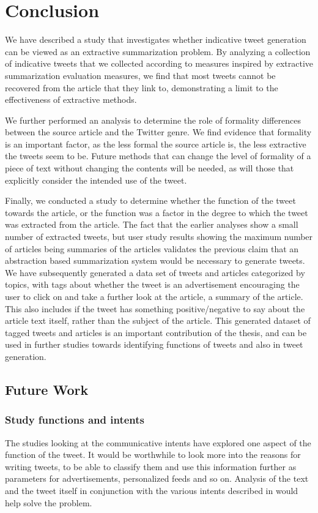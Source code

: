 \chapter{Conclusion}
We have described a study that investigates whether indicative tweet generation can be viewed as an extractive summarization problem. By analyzing a collection of indicative tweets that we collected according to measures inspired by extractive summarization evaluation measures, we find that most tweets cannot be recovered from the article that they link to, demonstrating a limit to the effectiveness of extractive methods.

We further performed an analysis to determine the role of formality differences between the source article and the Twitter genre. We find evidence that formality is an important factor, as the less formal the source article is, the less extractive the tweets seem to be. Future methods that can change the level of formality of a piece of text without changing the contents will be needed, as will those that explicitly consider the intended use of the tweet.

Finally, we conducted a study to determine whether the function of the tweet towards the article, or the function was a factor in the degree to which the tweet was extracted from the article. The fact that the earlier analyses show a small number of extracted tweets, but user study results showing the maximum number of articles being summaries of the articles validates the previous claim that an abstraction based summarization system would be necessary to generate tweets. We have subsequently generated a data set of tweets and articles categorized by topics, with tags about whether the tweet is an advertisement encouraging the user to click on and take a further look at the article, a summary of the article. This also includes if the tweet has something positive/negative to say about the article text itself, rather than the subject of the article. This generated dataset of tagged tweets and articles is an important contribution of the thesis, and can be used in further studies towards identifying functions of tweets and also in tweet generation.

\section{Future Work}

\subsection{Study functions and intents}
The studies looking at the communicative intents have explored one aspect of the function of the tweet. It would be worthwhile to look more into the reasons for writing tweets, to be able to classify them and use this information further as parameters for advertisements, personalized feeds and so on. Analysis of the text and the tweet itself in conjunction with the various intents described in \cite{sinclair1996preliminary} would help solve the problem.

